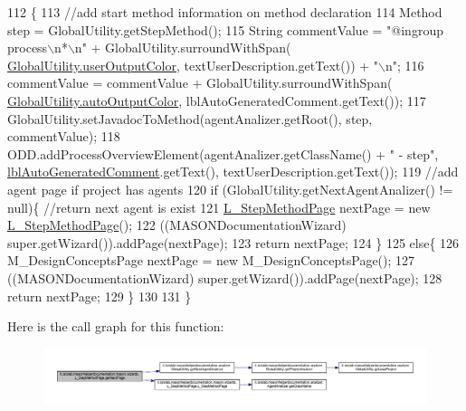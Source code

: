 \begin{DoxyCode}
112                                     \{ 
113         \textcolor{comment}{//add start method information on method declaration}
114         Method step = GlobalUtility.getStepMethod();
115         String commentValue = \textcolor{stringliteral}{"@ingroup process\(\backslash\)n*\(\backslash\)n"} + GlobalUtility.surroundWithSpan(
      \hyperlink{classit_1_1isislab_1_1masonhelperdocumentation_1_1analizer_1_1_global_utility_aec864cd710b27ece609c5a6093211ff4}{GlobalUtility.userOutputColor}, textUserDescription.getText()) + \textcolor{stringliteral}{"\(\backslash\)n"};
116         commentValue = commentValue + GlobalUtility.surroundWithSpan(
      \hyperlink{classit_1_1isislab_1_1masonhelperdocumentation_1_1analizer_1_1_global_utility_a42aa676ad1ff27c42cd4aab651ff2a35}{GlobalUtility.autoOutputColor}, lblAutoGeneratedComment.getText());
117         GlobalUtility.setJavadocToMethod(agentAnalizer.getRoot(), step, commentValue);
118         ODD.addProcessOverviewElement(agentAnalizer.getClassName() + \textcolor{stringliteral}{" - step"}, 
      \hyperlink{classit_1_1isislab_1_1masonhelperdocumentation_1_1mason_1_1wizards_1_1_l___step_method_page_af9b2ba2f488b5e92c1e8745127d3162c}{lblAutoGeneratedComment}.getText(), textUserDescription.getText());
119         \textcolor{comment}{//add agent page if project has agents}
120         \textcolor{keywordflow}{if} (GlobalUtility.getNextAgentAnalizer() != null)\{  \textcolor{comment}{//return next agent is exist}
121             \hyperlink{classit_1_1isislab_1_1masonhelperdocumentation_1_1mason_1_1wizards_1_1_l___step_method_page_ae63b8fc92a263e94bef137135e5f47da}{L\_StepMethodPage} nextPage = \textcolor{keyword}{new} \hyperlink{classit_1_1isislab_1_1masonhelperdocumentation_1_1mason_1_1wizards_1_1_l___step_method_page_ae63b8fc92a263e94bef137135e5f47da}{L\_StepMethodPage}();
122             ((MASONDocumentationWizard) super.getWizard()).addPage(nextPage);
123             \textcolor{keywordflow}{return} nextPage;
124         \}
125         \textcolor{keywordflow}{else}\{
126             M\_DesignConceptsPage nextPage = \textcolor{keyword}{new} M\_DesignConceptsPage();
127             ((MASONDocumentationWizard) super.getWizard()).addPage(nextPage);
128             \textcolor{keywordflow}{return} nextPage;
129         \}
130         
131     \}
\end{DoxyCode}


Here is the call graph for this function\-:
\nopagebreak
\begin{figure}[H]
\begin{center}
\leavevmode
\includegraphics[width=350pt]{classit_1_1isislab_1_1masonhelperdocumentation_1_1mason_1_1wizards_1_1_l___step_method_page_a3aa5cb9ab01aceaa78dd1294d9e5f330_cgraph}
\end{center}
\end{figure}


